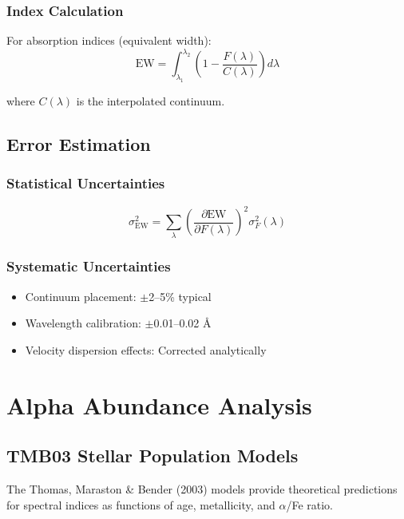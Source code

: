 \documentclass[12pt,a4paper]{article}
\begin{document}
\subsubsection{Index Calculation}
For absorption indices (equivalent width):
\begin{equation}
\text{EW} = \int_{\lambda_1}^{\lambda_2} \left(1 - \frac{F(\lambda)}{C(\lambda)}\right) d\lambda
\end{equation}

where $C(\lambda)$ is the interpolated continuum.

\subsection{Error Estimation}

\subsubsection{Statistical Uncertainties}
\begin{equation}
\sigma_{\text{EW}}^2 = \sum_{\lambda} \left(\frac{\partial \text{EW}}{\partial F(\lambda)}\right)^2 \sigma_F^2(\lambda)
\end{equation}

\subsubsection{Systematic Uncertainties}
\begin{itemize}
    \item Continuum placement: $\pm$2--5\% typical
    \item Wavelength calibration: $\pm$0.01--0.02 \AA
    \item Velocity dispersion effects: Corrected analytically
\end{itemize}

\section{Alpha Abundance Analysis}

\subsection{TMB03 Stellar Population Models}

The Thomas, Maraston \& Bender (2003) models provide theoretical predictions for spectral indices as functions of age, metallicity, and $\alpha$/Fe ratio.
\end{document}
